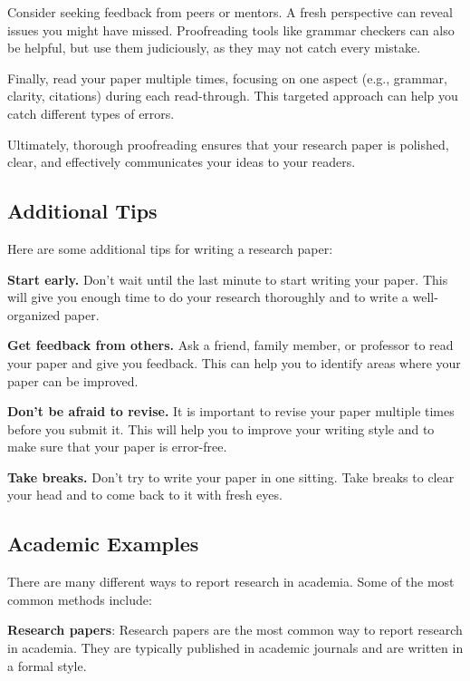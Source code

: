 \documentclass[
]{book}
\begin{document}
Consider seeking feedback from peers or mentors. A fresh perspective can reveal issues you might have missed. Proofreading tools like grammar checkers can also be helpful, but use them judiciously, as they may not catch every mistake.

Finally, read your paper multiple times, focusing on one aspect (e.g., grammar, clarity, citations) during each read-through. This targeted approach can help you catch different types of errors.

Ultimately, thorough proofreading ensures that your research paper is polished, clear, and effectively communicates your ideas to your readers.

\hypertarget{additional-tips}{%
\subsection*{Additional Tips}\label{additional-tips}}

Here are some additional tips for writing a research paper:

\textbf{Start early.} Don't wait until the last minute to start writing your paper. This will give you enough time to do your research thoroughly and to write a well-organized paper.

\textbf{Get feedback from others.} Ask a friend, family member, or professor to read your paper and give you feedback. This can help you to identify areas where your paper can be improved.

\textbf{Don't be afraid to revise.} It is important to revise your paper multiple times before you submit it. This will help you to improve your writing style and to make sure that your paper is error-free.

\textbf{Take breaks.} Don't try to write your paper in one sitting. Take breaks to clear your head and to come back to it with fresh eyes.

\hypertarget{academic-examples}{%
\subsection*{Academic Examples}\label{academic-examples}}

There are many different ways to report research in academia. Some of the most common methods include:

\textbf{Research papers}: Research papers are the most common way to report research in academia. They are typically published in academic journals and are written in a formal style.
\end{document}
